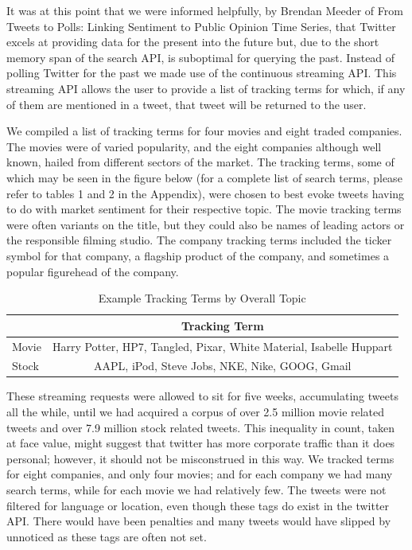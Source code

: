 \documentclass[11pt]{article}
\begin{document}
It was at this point that we were informed helpfully, by Brendan Meeder of From Tweets to Polls: Linking Sentiment to Public Opinion Time Series, that Twitter excels at providing data for the present into the future but, due to the short memory span of the search API, is suboptimal for querying the past. Instead of polling Twitter for the past we made use of the continuous streaming API. This streaming API allows the user to provide a list of tracking terms for which, if any of them are mentioned in a tweet, that tweet will be returned to the user.

We compiled a list of tracking terms for four movies and eight traded companies. The movies were of varied popularity, and the eight companies although well known, hailed from different sectors of the market. The tracking terms, some of which may be seen in the figure below (for a complete list of search terms, please refer to tables 1 and 2 in the Appendix), were chosen to best evoke tweets having to do with market sentiment for their respective topic. The movie tracking terms were often variants on the title, but they could also be names of leading actors or the responsible filming studio. The company tracking terms included the ticker symbol for that company, a flagship product of the company, and sometimes a popular figurehead of the company.

\begin{table}[htb!]
\centering
\caption{Example Tracking Terms by Overall Topic}
\begin{tabular}{|l|c|}
\hline
 & Tracking Term \\
\hline
Movie & Harry Potter, HP7, Tangled, Pixar, White Material, Isabelle Huppart\\
\hline
Stock & AAPL, iPod, Steve Jobs, NKE, Nike, GOOG, Gmail \\
\hline
\end{tabular}
\end{table}

These streaming requests were allowed to sit for five weeks, accumulating tweets all the while, until we had acquired a corpus of over 2.5 million movie related tweets and over 7.9 million stock related tweets. This inequality in count, taken at face value, might suggest that twitter has more corporate traffic than it does personal; however, it should not be misconstrued in this way. We tracked terms for eight companies, and only four movies; and for each company we had many search terms, while for each movie we had relatively few. 
The tweets were not filtered for language or location, even though these tags do exist in the twitter API. There would have been penalties and many tweets would have slipped by unnoticed as these tags are often not set.
\end{document}
